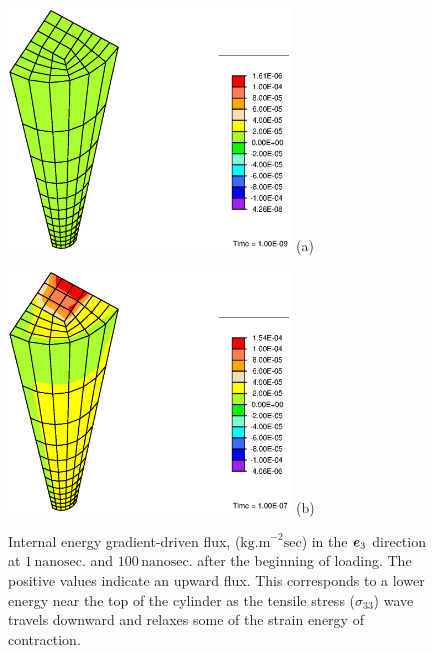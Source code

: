 \begin{figure}[!hpt]
\begin{minipage}[t]{7.5cm}
{\includegraphics[width=7.5cm]{images/examples/lagrangian/preliminary/M2-1}} \hskip 3cm (a)
\end{minipage}
\begin{minipage}[t]{7.5cm}
{\includegraphics[width=7.5cm]{images/examples/lagrangian/preliminary/M2-100}} \hskip 3cm (b)
\end{minipage}
\caption{Internal energy gradient-driven flux,
($\mathrm{kg.m}^{-2}\mathrm{sec}$) in the $\mbox{\boldmath$ e$}_3$ direction at $1
\,\mathrm{nanosec.}$ and $100\,\mathrm{nanosec.}$ after the
beginning of loading. The positive values indicate an upward flux.
This corresponds to a lower energy near the top of the cylinder as
the tensile stress ($\sigma_{33}$) wave travels downward and
relaxes some of the strain energy of contraction.} \label{M2fig}
\end{figure}

